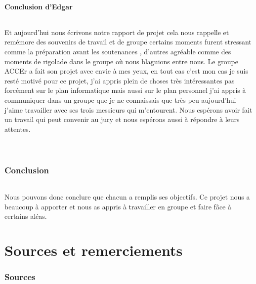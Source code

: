 \documentclass[titlepage, 13px, a4paper]{report}
\begin{document}
\subsection{Conclusion d'Edgar}
\paragraph{} \hspace{0pt}
Et aujourd’hui nous écrivons notre rapport de projet cela nous rappelle et remémore des souvenirs de travail et 
de groupe certains moments furent stressant comme la préparation avant les soutenances
, d’autres agréable comme des moments de rigolade dans le groupe où nous blaguions entre nous. Le groupe 
ACCEr a fait son projet avec envie à mes yeux, en tout cas c’est mon cas je suis resté motivé pour ce projet, 
j’ai appris plein de choses très intéressantes pas forcément sur le plan informatique mais aussi sur le plan 
personnel j’ai appris à communiquer dans un groupe que je ne connaissais que très peu aujourd’hui j’aime 
travailler avec ses trois messieurs qui m’entourent. Nous espérons avoir fait un travail qui peut convenir 
au jury et nous espérons aussi à répondre à leurs attentes. \\ \\ \\

\section*{Conclusion}
\paragraph{} \hspace{0pt}
Nous pouvons donc conclure que chacun a remplis ses objectifs.
Ce projet nous a beaucoup à apporter et nous as appris à travailler en groupe et faire fâce à certains aléas.



\newpage


\part{Sources et remerciements}

\section{Sources}
\end{document}

